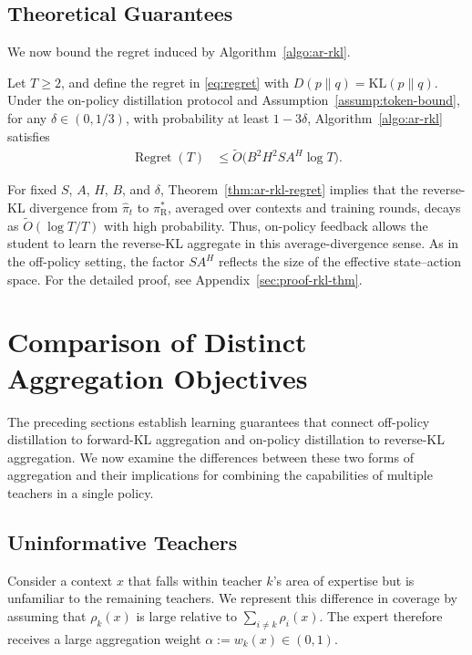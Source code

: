 \documentclass[11pt]{article}
\newcommand{\KL}{\text{KL}}
\newcommand{\pir}{\pi_{\mathrm{R}}}
\begin{document}
\subsection{Theoretical Guarantees}
We now bound the regret induced by Algorithm~\ref{algo:ar-rkl}. 
\begin{theorem}
\label{thm:ar-rkl-regret}
Let $T\geq2$, and define the regret in \eqref{eq:regret} with $D(p\|q)=\KL(p\|q)$. Under the on-policy distillation protocol and Assumption~\ref{assump:token-bound}, for any $\delta\in(0,1/3)$, with probability at least $1-3\delta$, Algorithm~\ref{algo:ar-rkl} satisfies
\begin{align*}
    \operatorname{Regret}(T)
    &\le \tilde O\big(B^2H^2SA^H \log T\big).
\end{align*}
\end{theorem}

For fixed $S$, $A$, $H$, $B$, and $\delta$, Theorem~\ref{thm:ar-rkl-regret} implies that the reverse-KL divergence from $\hat\pi_t$ to $\pir^*$, averaged over contexts and training rounds, decays as $\widetilde O(\log T/T)$ with high probability. Thus, on-policy feedback allows the student to learn the reverse-KL aggregate in this average-divergence sense. As in the off-policy setting, the factor $SA^H$ reflects the size of the effective state--action space. For the detailed proof, see Appendix~\ref{sec:proof-rkl-thm}.
\section{Comparison of Distinct Aggregation Objectives}
\label{sec:ar-target-comparison}
The preceding sections establish learning guarantees that connect off-policy distillation to forward-KL aggregation and on-policy distillation to reverse-KL aggregation. We now examine the differences between these two forms of aggregation and their implications for combining the capabilities of multiple teachers in a single policy.

\subsection{Uninformative Teachers}
Consider a context $x$ that falls within teacher $k$'s area of expertise but is unfamiliar to the remaining teachers. We represent this difference in coverage by assuming that $\rho_k(x)$ is large relative to $\sum_{i\neq k}\rho_i(x)$. The expert therefore receives a large aggregation weight $\alpha:=w_k(x) \in (0,1)$.
\end{document}
